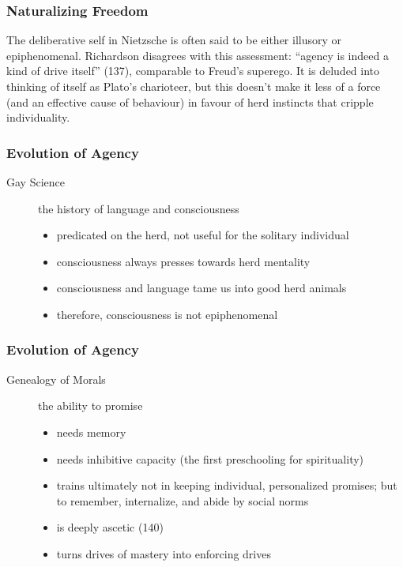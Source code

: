 \documentclass[xcolor=dvipsnames]{beamer}
\begin{document}
\begin{frame}
  \frametitle{Naturalizing Freedom}
  The deliberative self in Nietzsche is often said to be either
  illusory or epiphenomenal. Richardson disagrees with this
  assessment: ``agency is indeed a kind of drive itself'' (137),
  comparable to Freud's superego. It is deluded into thinking of
  itself as Plato's charioteer, but this doesn't make it less of a
  force (and an effective cause of behaviour) in favour of herd
  instincts that cripple individuality.
\end{frame}

\begin{frame}
  \frametitle{Evolution of Agency}
  \begin{description}
  \item[Gay Science] the history of language and consciousness
    \begin{itemize}
    \item predicated on the herd, not useful for the solitary
    individual
  \item consciousness always presses towards herd mentality
  \item consciousness and language tame us into good herd animals
  \item therefore, consciousness is not epiphenomenal
    \end{itemize}
  \end{description}
\end{frame}

\begin{frame}
  \frametitle{Evolution of Agency}
  \begin{description}
  \item[Genealogy of Morals] the ability to promise
    \begin{itemize}
    \item needs memory
    \item needs inhibitive capacity (the first preschooling for
      spirituality)
    \item trains ultimately not in keeping individual, personalized
      promises; but to remember, internalize, and abide by social
      norms
    \item is deeply ascetic (140)
    \item turns drives of mastery into enforcing drives
    \end{itemize}
  \end{description}
\end{frame}
\end{document}
